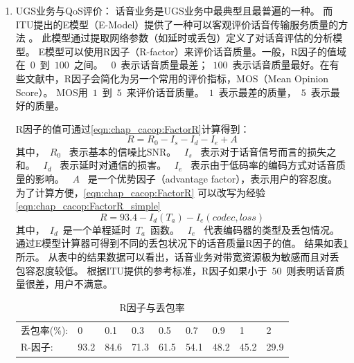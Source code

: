\begin{enumerate}[(1)]
    \item UGS业务与QoS评价：
        话音业务是UGS业务中最典型且最普遍的一种。
        而ITU提出的E模型（E-Model）提供了一种可以客观评价话音传输服务质量的方法 \cite{ITU:G107}。
        此模型通过提取网络参数（如延时或丢包）定义了对话音评估的分析模型。
        E模型可以使用R因子（R-factor）来评价话音质量。一般，R因子的值域在~$0$~到~$100$~之间。
        ~$0$~表示话音质量最差；~$100$~表示话音质量最好。在有些文献中，R因子会简化为另一个常用的评价指标，MOS（Mean Opinion Score）。
        MOS用~$1$~到~$5$~来评价话音质量。~$1$~表示最差的质量，~$5$~表示最好的质量\cite{NK:IEICE:2005}。

        R因子的值可通过\eqref{eqn:chap_cacop:FactorR}计算得到：
\begin{equation}
\label{eqn:chap_cacop:FactorR}
R = R_0 − I_s − I_d − I_e + A 
\end{equation}
其中，~$R_0$~ 表示基本的信噪比SNR。
~$I_s$~ 表示对于话音信号而言的损失之和。
~$I_d$~ 表示延时对通信的损害。
~$I_e$~ 表示由于低码率的编码方式对话音质量的影响。
~$A$~ 是一个优势因子（advantage factor），表示用户的容忍度。
为了计算方便，\eqref{eqn:chap_cacop:FactorR} 可以改写为经验\eqref{eqn:chap_cacop:FactorR_simple}
\begin{equation}
R = 93. 4 - I_d ( T_a ) -I_e ( codec, loss )
\label{eqn:chap_cacop:FactorR_simple}
\end{equation}
其中，~$I_d$~是一个单程延时~$T_a$~函数。
~$I_e$~ 代表编码器的类型及丢包情况。
通过E模型计算器可得到不同的丢包状况下的话音质量R因子的值\cite{ITU:EModel:Caculator}。 
结果如表\ref{tb:R_factor}所示。
从表中的结果数据可以看出，话音业务对带宽资源极为敏感而且对丢包容忍度较低。
根据ITU提供的参考标准，R因子如果小于~$50$~则表明话音质量很差，用户不满意。

\begin{table}[tb]
\setlength{\abovecaptionskip}{2pt}
\setlength{\belowcaptionskip}{8pt}
\caption{R因子与丢包率} \label{tb:R_factor}
\begin{center}
\wuhao
\begin{tabularx}{0.99\textwidth}{lXXXXXXXX}
\toprule 
丢包率(\%): & 0& 0.1& 0.3& 0.5& 0.7& 0.9& 1& 2\\
R-因子: &93.2& 84.6& 71.3& 61.5& 54.1& 48.2& 45.2& 29.9\\ 
\bottomrule
\end{tabularx}
\end{center}
\end{table}


\end{enumerate}
